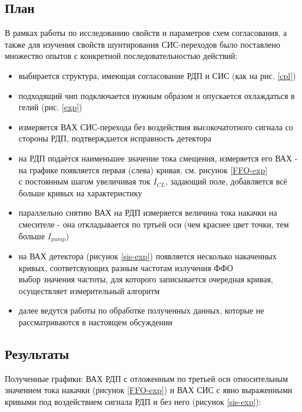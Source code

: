 \documentclass[12pt,a4paper]{article}
\begin{document}
\subsection{План}

В рамках работы по исследованию свойств и параметров схем согласования, а также для изучения свойств шунтирования СИС-переходов было поставлено множество опытов с конкретной последовательностью действий:

    \begin{itemize}
        \item выбирается структура, имеющая согласование РДП и СИС (как на рис. \ref{cpl})
        \item подходящий чип подключается нужным образом и опускается охлаждаться в гелий (рис. \ref{exp})
        \item измеряется ВАХ СИС-перехода без воздействия высокочатотного сигнала со стороны РДП, подтверждается исправность детектора
        \item на РДП подаётся наименьшее значение тока смещения, измеряется его ВАХ - на графике появляется первая (слева) кривая, см. рисунок \ref{FFO-exp}\\
        с постоянным шагом увеличивая ток $I_{CL}$, задающий поле, добавляется всё больше кривых на характеристику
        \item параллельно снятию ВАХ на РДП измеряется величина тока накачки на смесителе - она откладывается по тртьей оси (чем краснее цвет точки, тем больше $I_{pump}$)
        \item на ВАХ детектора (рисунок \ref{sis-exp}) появляется несколько накаченных кривых, соответсвующих разным частотам излучения ФФО\\
        выбор значения частоты, для которого записывается очередная кривая, осуществляет измерительный алгоритм
        \item далее ведутся работы по обработке полученных данных, которые не рассматриваются в настоящем обсуждении
    \end{itemize}

\newpage

\subsection{Результаты}

Полученные графики: ВАХ РДП с отложенным по третьей оси относительным значением тока накачки (рисунок \ref{FFO-exp}) и ВАХ СИС с явно выраженными кривыми под воздействием сигнала РДП и без него (рисунок \ref{sis-exp}):
\end{document}
